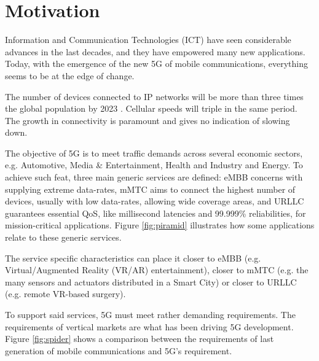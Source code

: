 \section{Motivation}
\label{sec:intro}

Information and Communication Technologies (ICT) have seen considerable advances in the last decades, and they have empowered many new applications. Today, with the emergence of the new \ac{5G} of mobile communications, everything seems to be at the edge of change.

The number of devices connected to \ac{IP} networks will be more than three times the global population by 2023 \cite{cisco}. Cellular speeds will triple in the same period. The growth in connectivity is paramount and gives no indication of slowing down.

The objective of \ac{5G} is to meet traffic demands across several economic sectors, e.g. Automotive, Media \& Entertainment, Health and Industry and Energy. To achieve such feat, three main generic services are defined: \ac{eMBB} concerns with supplying extreme data-rates, \ac{mMTC} aims to connect the highest number of devices, usually with low data-rates, allowing wide coverage areas, and \ac{URLLC} guarantees essential \ac{QoS}, like millisecond latencies and 99.999\% reliabilities, for mission-critical applications. Figure \ref{fig:piramid} illustrates how some applications relate to these generic services.


The service specific characteristics can place it closer to \ac{eMBB} (e.g. Virtual/Augmented Reality (VR/AR) entertainment), closer to \ac{mMTC} (e.g. the many sensors and actuators distributed in a Smart City) or closer to \ac{URLLC} (e.g. remote VR-based surgery). 


To support said services, \ac{5G} must meet rather demanding requirements. The requirements of vertical markets are what has been driving 5G development. Figure \ref{fig:spider} shows a comparison between the requirements of last generation of mobile communications and 5G's requirement.


